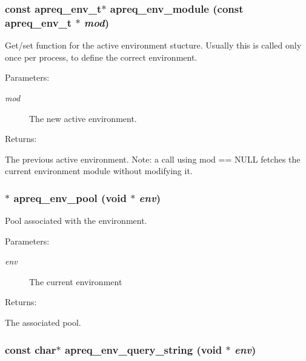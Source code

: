 \subsubsection{\setlength{\rightskip}{0pt plus 5cm}const {\bf apreq\_\-env\_\-t}$\ast$ apreq\_\-env\_\-module (const {\bf apreq\_\-env\_\-t} $\ast$ {\em mod})}\label{group__ENV_a12}


Get/set function for the active environment stucture. Usually this is called only once per process, to define the correct environment. \begin{Desc}
\item[Parameters: ]\par
\begin{description}
\item[{\em 
mod}]The new active environment. \end{description}
\end{Desc}
\begin{Desc}
\item[Returns: ]\par
The previous active environment. Note: a call using mod == NULL fetches the current environment module without modifying it. \end{Desc}
\subsubsection{$\ast$ apreq\_\-env\_\-pool ({\bf void} $\ast$ {\em env})}\label{group__ENV_a2}


Pool associated with the environment. \begin{Desc}
\item[Parameters: ]\par
\begin{description}
\item[{\em 
env}]The current environment \end{description}
\end{Desc}
\begin{Desc}
\item[Returns: ]\par
The associated pool. \end{Desc}
\subsubsection{\setlength{\rightskip}{0pt plus 5cm}const char$\ast$ apreq\_\-env\_\-query\_\-string ({\bf void} $\ast$ {\em env})}\label{group__ENV_a5}


